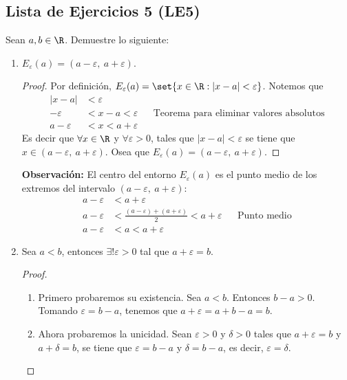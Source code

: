 \subsection*{Lista de Ejercicios 5 (LE5)}

Sean $a,b \in \R$. Demuestre lo siguiente:

\begin{enumerate}[label=\alph*)]
  
  \item $E_\varepsilon(a) = (a-\varepsilon, \ a+\varepsilon)$.
  
  \begin{proof}\leavevmode
    Por definición, $E_\varepsilon(a) = \set{x\in \R: |x-a|<\varepsilon}$. Notemos que
    \begin{align*}
      |x - a | &< \varepsilon\\
      -\varepsilon &< x-a < \varepsilon && \text{Teorema para eliminar valores absolutos}\\
      a -\varepsilon &< x < a+ \varepsilon
    \end{align*}
    Es decir que $\forall x\in \R$ y $\forall \varepsilon>0$, tales que $|x-a|<\varepsilon$ se tiene que $x\in (a-\varepsilon, \ a+ \varepsilon)$. Osea que $E_\varepsilon(a) = (a-\varepsilon, \ a+\varepsilon)$.
  \end{proof}
  \textbf{Observación:} El centro del entorno $E_\varepsilon(a)$ es el punto medio de los extremos del intervalo $(a-\varepsilon, \ a+\varepsilon)$:
  \begin{align*}
    a - \varepsilon &< a + \varepsilon\\
    a- \varepsilon &< \frac{(a - \varepsilon)+(a + \varepsilon)}{2} < a + \varepsilon && \text{Punto medio}\\
    a- \varepsilon &< a < a + \varepsilon
  \end{align*}
  
  \item Sea $a<b$, entonces $\exists! \varepsilon>0$ tal que $a+\varepsilon=b$.
 \begin{proof}\leavevmode
  \begin{enumerate}[label=\roman*)]
    \item Primero probaremos su existencia. Sea $a<b$. Entonces $b-a>0$. Tomando $\varepsilon=b-a$, tenemos que $a+\varepsilon=a+b-a=b$.
    \item Ahora probaremos la unicidad. Sean $\varepsilon>0$ y $\delta>0$ tales que $a+\varepsilon=b$ y $a+\delta=b$, se tiene que $\varepsilon=b-a$ y $\delta=b-a$, es decir, $\varepsilon=\delta$. \qedhere
  \end{enumerate}
 \end{proof}
 

\end{enumerate}
